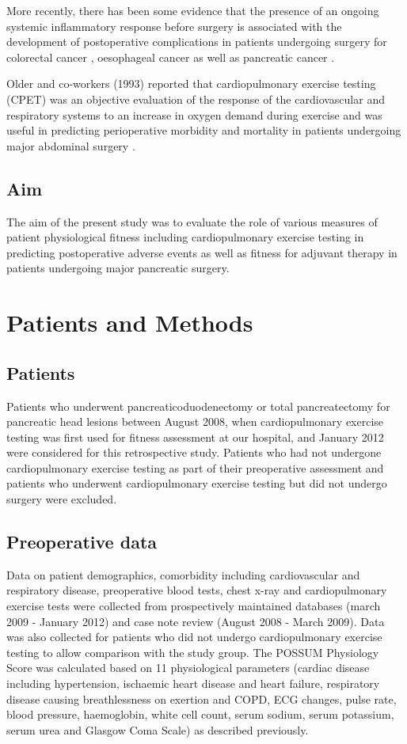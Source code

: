 More recently, there has been some evidence that the presence of an ongoing systemic inflammatory response before surgery is associated with the development of postoperative complications in patients undergoing surgery for colorectal cancer \parencite{moyes_preoperative_2009}, oesophageal cancer \parencite{vashist_glasgow_2010} as well as pancreatic cancer \parencite{knight_evaluation_2010}.

Older and co-workers (1993) reported that cardiopulmonary exercise testing (CPET) was an objective evaluation of the response of the cardiovascular and respiratory systems to an increase in oxygen demand during exercise and was useful in predicting perioperative morbidity and mortality in patients undergoing major abdominal surgery \parencite{older_preoperative_1993}.

\subsection{Aim}
The aim of the present study was to evaluate the role of various measures of patient physiological fitness including cardiopulmonary exercise testing in predicting postoperative adverse events as well as fitness for adjuvant therapy in patients undergoing major pancreatic surgery.

\clearpage

\section{Patients and Methods}

\subsection{Patients}
Patients who underwent pancreaticoduodenectomy or total pancreatectomy for pancreatic head lesions between August 2008, when cardiopulmonary exercise testing was first used for fitness assessment at our hospital, and January 2012 were considered for this retrospective study. 
Patients who had not undergone cardiopulmonary exercise testing as part of their preoperative assessment and patients who underwent cardiopulmonary exercise testing but did not undergo surgery were excluded. 

\subsection{Preoperative data}
Data on patient demographics, comorbidity including cardiovascular and respiratory disease, preoperative blood tests, chest x-ray and cardiopulmonary exercise tests were collected from prospectively maintained databases (march 2009 - January 2012) and case note review (August 2008 - March 2009). 
Data was also collected for patients who did not undergo cardiopulmonary exercise testing to allow comparison with the study group. 
The POSSUM Physiology Score was calculated based on 11 physiological parameters (cardiac disease including hypertension, ischaemic heart disease and heart failure, respiratory disease causing breathlessness on exertion and COPD, ECG changes, pulse rate, blood pressure, haemoglobin, white cell count, serum sodium, serum potassium, serum urea and Glasgow Coma Scale) as described previously.

